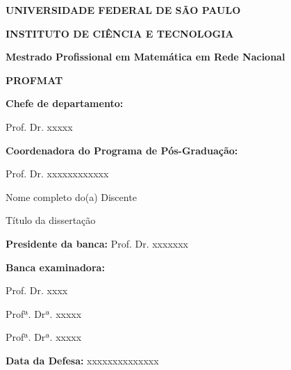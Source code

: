 \documentclass[oneside,a4paper,12pt]{book}
\theoremstyle{plain}
\newcommand{\myTitle}{Título da dissertação}
\newcommand{\myName}{Nome completo do(a) Discente}
\newcommand{\myProf}{Prof. Dr. xxxxxxx} %
\newcommand{\myDefenseDay}{xxxxxxxxxxxxxx} %
\newcommand{\myRefereeONE}{Prof. Dr. xxxx}
\newcommand{\myRefereeTWO}{Profª. Drª. xxxxx}
\newcommand{\myRefereeTHREE}{Profª. Drª. xxxxx}
\newcommand{\deptChair}{Prof. Dr. xxxxx}  %
\newcommand{\programCoord}{Prof. Dr. xxxxxxxxxxxx} %
\begin{document}
		
	
	

	\newpage
	\thispagestyle{plain}
	
	
	\begin{center}
		\textbf{UNIVERSIDADE FEDERAL DE SÃO PAULO }
		
		\vspace{.3cm}
		
		\textbf{INSTITUTO DE CIÊNCIA E TECNOLOGIA} 
		
		\vspace{.6cm}    	   
		
		\textbf{Mestrado Profissional em Matemática em Rede Nacional}
		
		\textbf{PROFMAT}
	\end{center}
	
	\vfill 
	
	\textbf{Chefe de departamento:}     
	
	\hspace{1cm} \deptChair 
	
	\vspace{.3cm} 
	
	\textbf{Coordenadora do Programa de Pós-Graduação:} 
	
	\hspace{1cm} \programCoord 
	
	\vfill                      
	\newpage
	\thispagestyle{plain}
	
	\vfill
	
	\begin{center}
		\myName
		
		\vspace{.3cm}
		
		\myTitle 
		
	\end{center}
	
	
	
	\vfill
	
	
	\textbf{Presidente da banca:} \myProf \medskip
	
	\vspace{.3cm} 
	
	\textbf{Banca examinadora:} \medskip 
	
	\myRefereeONE \medskip
	
	\myRefereeTWO \medskip
	
	\myRefereeTHREE \medskip
	
	\vspace{.3cm} 
	
	\textbf{Data da Defesa:} \myDefenseDay
	
\end{document}
